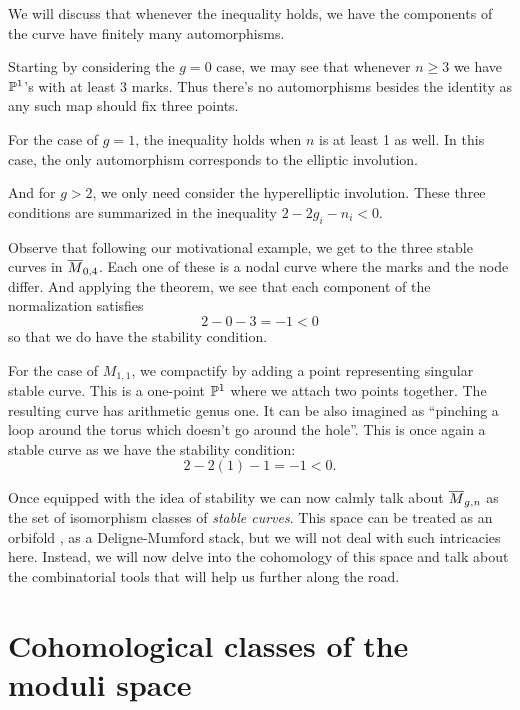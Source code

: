 \documentclass[12pt]{memoir}
\begin{document}
\begin{ptcb}
    We will discuss that whenever the inequality holds, we have the components of the curve have finitely many automorphisms.\par
    Starting by considering the $g=0$ case, we may see that whenever $n\geq 3$ we have $\mathbb{P}^1$'s with at least 3 marks. Thus there's no automorphisms besides the identity as any such map should fix three points.\par
    For the case of $g=1$, the inequality holds when $n$ is at least 1 as well. In this case, the only automorphism corresponds to the elliptic involution.\par
    And for $g>2$, we only need consider the hyperelliptic involution.
    These three conditions are summarized in the inequality $2-2g_i-n_i<0$.
\end{ptcb}
\begin{Ex}
    Observe that following our motivational example, we get to the three stable curves in $\overline M_{0,4}$. Each one of these is a nodal curve where the marks and the node differ. And applying the theorem, we see that each component of the normalization satisfies
    $$2-0-3=-1<0$$
    so that we do have the stability condition. 
\end{Ex}

\begin{Ex}\label{ex-Mg1n1-compactification}
    For the case of $M_{1,1}$, we compactify by adding a point representing singular stable curve. This is a one-point $\mathbb{P}^1$ where we attach two points together. The resulting curve has arithmetic genus one. It can be also imagined as ``pinching a loop around the torus which doesn't go around the hole''. This is once again a stable curve as we have the stability condition:
    $$2-2(1)-1=-1<0.$$
\end{Ex}

Once equipped with the idea of stability we can now calmly talk about $\overline M_{g,n}$ as the set of isomorphism classes of \emph{stable curves}. This space can be treated as an orbifold \cite{ZvonkineIntro}, as a Deligne-Mumford stack, but we will not deal with such intricacies here. Instead, we will now delve into the cohomology of this space and talk about the combinatorial tools that will help us further along the road.

\section{Cohomological classes of the moduli space}
\end{document}
